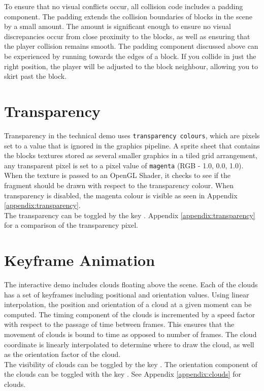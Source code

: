 \documentclass{book}
\begin{document}
To ensure that no visual conflicts occur, all collision code includes a padding component.  The padding extends the collision boundaries of blocks in the scene by a small amount.   The amount is significant enough to ensure no visual discrepancies occur from close proximity to the blocks, as well as ensuring that the player collision remains smooth.  The padding component discussed above can be experienced by running towards the edges of a block.  If you collide in just the right position, the player will be adjusted to the block neighbour, allowing you to skirt past the block.
   
\section{Transparency}
Transparency in the technical demo uses \texttt{transparency colours}, which are pixels set to a value that is ignored in the graphics pipeline.  A sprite sheet that contains the blocks textures stored as several smaller graphics in a tiled grid arrangement, any transparent pixel is set to a pixel value of \texttt{magenta} (RGB - 1.0, 0.0, 1.0).  When the texture is passed to an OpenGL Shader, it checks to see if the fragment should be drawn with respect to the transparency colour.  When transparency is disabled, the magenta colour is visible as seen in Appendix \ref{appendix:transparency}.
\\
The transparency can be toggled by the key .  Appendix \ref{appendix:transparency} for a comparison of the transparency pixel.
    
\section{Keyframe Animation}
The interactive demo includes clouds floating above the scene.  Each of the clouds has a set of keyframes including positional and orientation values.  Using linear interpolation, the position and orientation of a cloud at a given moment can be computed.  The timing component of the clouds is incremented by a speed factor with respect to the passage of time between frames.  This ensures that the movement of clouds is bound to time as opposed to number of frames.  The cloud coordinate is linearly interpolated to determine where to draw the cloud, as well as the orientation factor of the cloud.  
\\
The visibility of clouds can be toggled by the key .  The orientation component of the clouds can be toggled with the key .  See Appendix \ref{appendix:clouds} for clouds.
\end{document}
